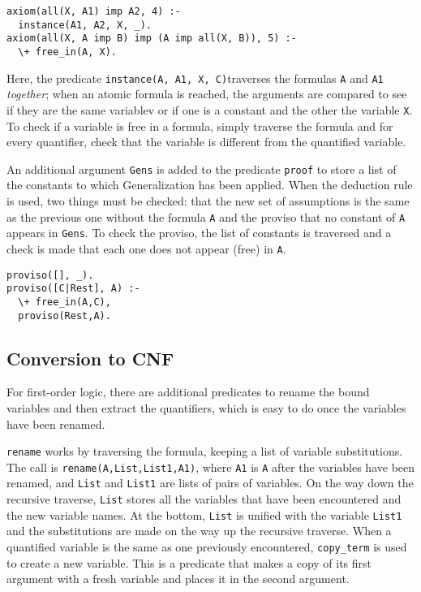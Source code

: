 \documentclass[11pt]{article}
\newcommand*{\p}[1]{\textup{\texttt{#1}}}
\begin{document}
\begin{verbatim}
axiom(all(X, A1) imp A2, 4) :-
  instance(A1, A2, X, _).
axiom(all(X, A imp B) imp (A imp all(X, B)), 5) :-
  \+ free_in(A, X).
\end{verbatim}

Here, the predicate \p{instance(A, A1, X, C)}traverses the formulas
\p{A} and \p{A1} \emph{together}; when an atomic formula is reached, the
arguments are compared to see if they are the same variablev or if one
is a constant and the other the variable \p{X}. To check if a variable
is free in a formula, simply traverse the formula and for every
quantifier, check that the variable is different from the quantified
variable.

An additional argument \p{Gens} is added to the predicate \p{proof} to
store a list of the constants to which Generalization has been applied.
When the deduction rule is used, two things must be checked: that the
new set of assumptions is the same as the previous one without the
formula \p{A} and the proviso that no constant of \p{A} appears in
\p{Gens}. To check the proviso, the list of constants is traversed and a
check is made that each one does not appear (free) in \p{A}.

\begin{verbatim}
proviso([], _).
proviso([C|Rest], A) :-
  \+ free_in(A,C),
  proviso(Rest,A).
\end{verbatim}




\subsection{Conversion to CNF}

For first-order logic, there are additional predicates to rename the
bound variables and then extract the quantifiers, which is easy to do
once the variables have been renamed.

\p{rename} works by traversing the formula, keeping a list of variable
substitutions. The call is \p{rename(A,List,List1,A1)}, where \p{A1} is
\p{A} after the variables have been renamed, and \p{List} and \p{List1}
are lists of pairs of variables. On the way down the recursive traverse,
\p{List} stores all the variables that have been encountered and the new
variable names. At the bottom, \p{List} is unified with the variable
\p{List1} and the substitutions are made on the way up the recursive
traverse. When a quantified variable is the same as one previously
encountered, \p{copy\_term} is used to create a new variable. This is a
predicate that makes a copy of its first argument with a fresh variable
and places it in the second argument.
\end{document}
